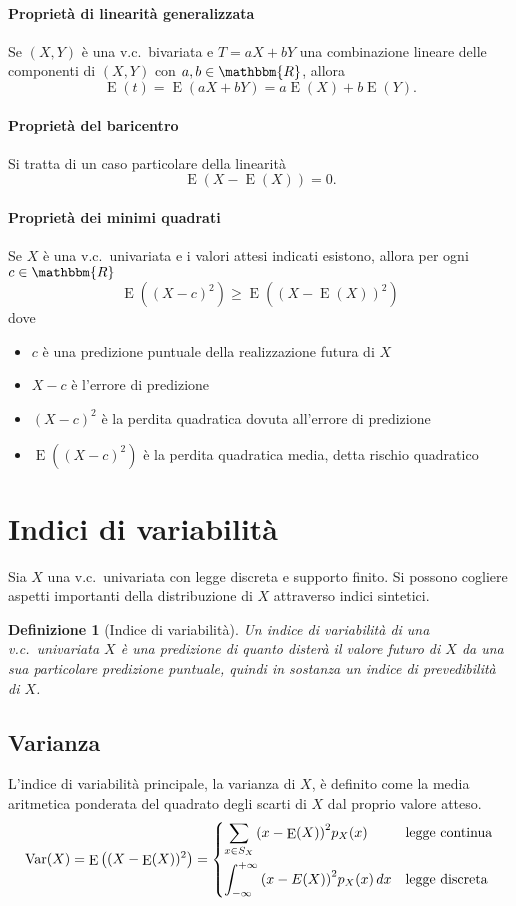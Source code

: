 \documentclass[11pt,a4paper,twoside]{article}
\newtheorem{definition}{Definizione}
\let\geq\geqslant%
\newcommand\R{\mathbbm{R}}
\newcommand\dx{\,dx}
\DeclareMathOperator{\Var}{Var}
\DeclareMathOperator{\E}{E}
\begin{document}
\paragraph{Proprietà di linearità generalizzata} Se \((X, Y)\) è una
v.c.\ bivariata e \(T = aX + bY\) una combinazione lineare delle
componenti di \((X, Y)\) con \(a, b \in \R\), allora
\[
  \E(t) = \E(aX + bY) = a\E(X) + b\E(Y).
\]

\paragraph{Proprietà del baricentro} Si tratta di un caso particolare
della linearità
\[
  \E(X - \E(X)) = 0.
\]

\paragraph{Proprietà dei minimi quadrati} Se \(X\) è una v.c.\
univariata e i valori attesi indicati esistono, allora per ogni
\(c\in\R\)
\[
  \E\left( (X-c)^2 \right) \geq \E\left( (X - \E(X))^2 \right)
\]
dove
\begin{itemize}
\item \(c\) è una predizione puntuale della realizzazione futura di
  \(X\)
\item \(X-c\) è l'errore di predizione
\item \( (X-c)^2 \) è la perdita quadratica dovuta all'errore di
  predizione
\item \(\E((X-c)^2)\) è la perdita quadratica media, detta rischio quadratico
\end{itemize}

\section{Indici di variabilità}
Sia \(X\) una v.c.\ univariata con legge discreta e supporto finito.
Si possono cogliere aspetti importanti della distribuzione di \(X\)
attraverso indici sintetici.

\begin{definition}[Indice di variabilità]
  Un indice di variabilità di una v.c.\ univariata \(X\) è una
  predizione di quanto disterà il valore futuro di \(X\) da una sua
  particolare predizione puntuale, quindi in sostanza un indice di
  prevedibilità di \(X\).
\end{definition}

\subsection{Varianza}
L'indice di variabilità principale, la varianza di \(X\), è definito
come la media aritmetica ponderata del quadrato degli scarti di \(X\)
dal proprio valore atteso.
\[
  \Var(X) = \E\left( (X - \E(X))^2 \right) = \begin{dcases}
    \sum_{x\in S_X}{(x - \E(X))}^2 p_X(x) & \mbox{legge continua} \\
    \int_{-\infty}^{+\infty} {(x - E(X))}^2 p_X(x) \dx & \mbox{legge
      discreta}
  \end{dcases}
\]
\end{document}
